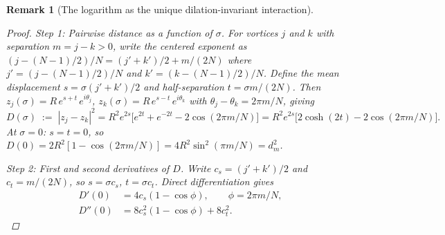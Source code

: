 \documentclass[12pt, a4paper]{article}
\newtheorem{remark}{Remark}[section]
\numberwithin{equation}{section}
\begin{document}
\begin{remark}[The logarithm as the unique dilation-invariant interaction]
\begin{proof}
\emph{Step 1: Pairwise distance as a function of $\sigma$.}
For vortices $j$ and $k$ with separation $m = j - k > 0$, write
the centered exponent as $(j - (N{-}1)/2)/N = (j' + k')/2 + m/(2N)$
where $j' = (j-(N{-}1)/2)/N$ and $k' = (k-(N{-}1)/2)/N$.
Define the mean displacement $s = \sigma(j'+k')/2$ and half-separation
$t = \sigma m/(2N)$.  Then $z_j(\sigma) = R\,e^{s+t}\,e^{i\theta_j}$,
$z_k(\sigma) = R\,e^{s-t}\,e^{i\theta_k}$ with
$\theta_j - \theta_k = 2\pi m/N$, giving
\[
  D(\sigma) \;{:=}\; |z_j - z_k|^2
  = R^2 e^{2s}\bigl[e^{2t} + e^{-2t} - 2\cos(2\pi m/N)\bigr]
  = R^2 e^{2s}\bigl[2\cosh(2t) - 2\cos(2\pi m/N)\bigr].
\]
At $\sigma = 0$: $s = t = 0$, so
$D(0) = 2R^2[1 - \cos(2\pi m/N)] = 4R^2\sin^2(\pi m/N) = d_m^2$.

\emph{Step 2: First and second derivatives of $D$.}
Write $c_s = (j'+k')/2$ and $c_t = m/(2N)$, so
$s = \sigma c_s$, $t = \sigma c_t$.  Direct differentiation gives
\begin{align*}
  D'(0) &= 4c_s(1 - \cos\phi), \qquad \phi = 2\pi m/N, \\[3pt]
  D''(0) &= 8c_s^2(1 - \cos\phi) + 8c_t^2.
\end{align*}


\end{proof}
\end{remark}
\end{document}
